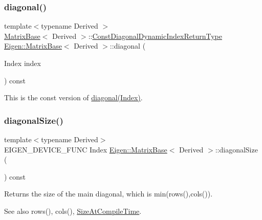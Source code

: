 \subsubsection{\texorpdfstring{diagonal()}{diagonal()}\hspace{0.1cm}{\footnotesize\ttfamily [4/4]}}
{\footnotesize\ttfamily template$<$typename Derived $>$ \\
\mbox{\hyperlink{class_eigen_1_1_matrix_base}{Matrix\+Base}}$<$ Derived $>$\+::\mbox{\hyperlink{class_eigen_1_1_transpose}{Const\+Diagonal\+Dynamic\+Index\+Return\+Type}} \mbox{\hyperlink{class_eigen_1_1_matrix_base}{Eigen\+::\+Matrix\+Base}}$<$ Derived $>$\+::diagonal (\begin{DoxyParamCaption}\item[{Index}]{index }\end{DoxyParamCaption}) const\hspace{0.3cm}{\ttfamily [inline]}}

This is the const version of \mbox{\hyperlink{class_eigen_1_1_matrix_base_a8a13d4b8efbd7797ee8efd3dd988a7f7}{diagonal(\+Index)}}. \mbox{\label{class_eigen_1_1_matrix_base_a3bcb5338f3ba8a1a5609bd1802a9bc95}} 
\subsubsection{\texorpdfstring{diagonalSize()}{diagonalSize()}}
{\footnotesize\ttfamily template$<$typename Derived$>$ \\
E\+I\+G\+E\+N\+\_\+\+D\+E\+V\+I\+C\+E\+\_\+\+F\+U\+NC Index \mbox{\hyperlink{class_eigen_1_1_matrix_base}{Eigen\+::\+Matrix\+Base}}$<$ Derived $>$\+::diagonal\+Size (\begin{DoxyParamCaption}{ }\end{DoxyParamCaption}) const\hspace{0.3cm}{\ttfamily [inline]}}

\begin{DoxyReturn}{Returns}
the size of the main diagonal, which is min(rows(),cols()). 
\end{DoxyReturn}
\begin{DoxySeeAlso}{See also}
rows(), cols(), \mbox{\hyperlink{class_eigen_1_1_dense_base_a86241c772c74c04eeeb0480b99c5ab77a25cb495affdbd796198462b8ef06be91}{Size\+At\+Compile\+Time}}. 
\end{DoxySeeAlso}
\mbox{\label{class_eigen_1_1_matrix_base_a2c84258ecc93fc1a0a2d4fa22b99dd99}} 
